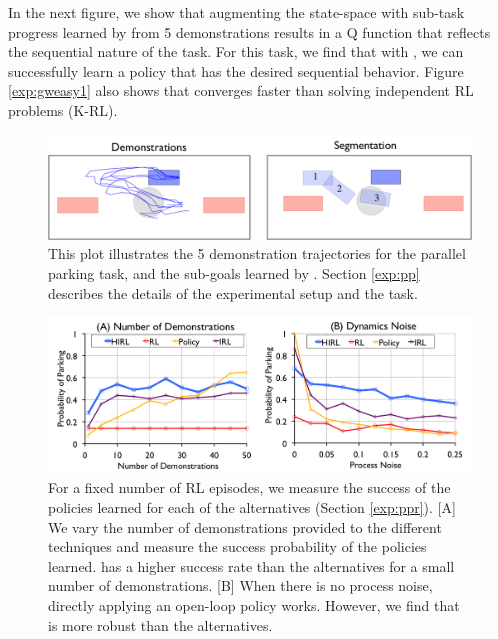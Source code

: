In the next figure, we show that augmenting the state-space with sub-task progress learned by \hirl from 5 demonstrations results in a Q function that reflects the sequential nature of the task.
For this task, we find that with \hirl, we can successfully learn a policy that has the desired sequential behavior.
Figure \ref{exp:gweasy1} also shows that \hirl converges faster than solving independent RL problems (K-RL).

\begin{figure}[t]
\centering
 \includegraphics[width=\columnwidth]{exp/rc-car-segmentation.png}
 \caption{This plot illustrates the 5 demonstration trajectories for the parallel parking task, and the sub-goals learned by \hirl. Section \ref{exp:pp} describes the details of the experimental setup and the task. \label{exp:rcsegmentation}}
\end{figure}

\begin{figure}[t]
\centering
 \includegraphics[width=\columnwidth]{exp/rc-car-segmentation-2ab.png}
 \caption{For a fixed number of RL episodes, we measure the success of the policies learned for each of the alternatives (Section \ref{exp:ppr}). [A] We vary the number of demonstrations provided to the different techniques and measure the success probability of the policies learned. \hirl has a higher success rate than the alternatives for a small number of demonstrations. [B] When there is no process noise, directly applying an open-loop policy works. However, we find that \hirl is more robust than the alternatives.  \label{exp:rcsegmentation-res2}}
\end{figure}


